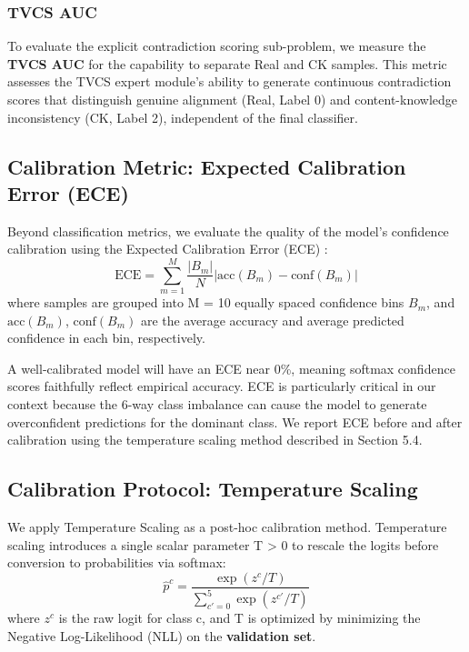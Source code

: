 \subsubsection{TVCS AUC}
To evaluate the explicit contradiction scoring sub-problem, we measure the \textbf{TVCS AUC} for the capability to separate Real and CK samples. This metric assesses the TVCS expert module's ability to generate continuous contradiction scores that distinguish genuine alignment (Real, Label 0) and content-knowledge inconsistency (CK, Label 2), independent of the final classifier.

\subsection{Calibration Metric: Expected Calibration Error (ECE)}
Beyond classification metrics, we evaluate the quality of the model's confidence calibration using the Expected Calibration Error (ECE) \cite{ref10}:
\begin{equation}
\text{ECE} = \sum_{m=1}^M \frac{|B_m|}{N} |\text{acc}(B_m) - \text{conf}(B_m)|
\end{equation}
where samples are grouped into M = 10 equally spaced confidence bins $B_m$, and $\text{acc}(B_m)$, $\text{conf}(B_m)$ are the average accuracy and average predicted confidence in each bin, respectively.

A well-calibrated model will have an ECE near 0\%, meaning softmax confidence scores faithfully reflect empirical accuracy. ECE is particularly critical in our context because the 6-way class imbalance can cause the model to generate overconfident predictions for the dominant class. We report ECE before and after calibration using the temperature scaling method described in Section 5.4.

\subsection{Calibration Protocol: Temperature Scaling}
We apply Temperature Scaling \cite{ref10} as a post-hoc calibration method. Temperature scaling introduces a single scalar parameter T > 0 to rescale the logits before conversion to probabilities via softmax:
\begin{equation}
\hat{p}^c = \frac{\exp(z^c/T)}{\sum_{c'=0}^5 \exp(z^{c'}/T)}
\end{equation}
where $z^c$ is the raw logit for class c, and T is optimized by minimizing the Negative Log-Likelihood (NLL) on the \textbf{validation set}.

